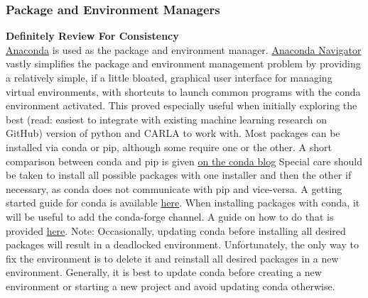 \documentclass{article}
\begin{document}
\subsubsection{Package and Environment Managers}
\label{subsec: Environment Managers}
\textbf{Definitely Review For Consistency}\\
\href{https://www.anaconda.com/}{Anaconda} is used as the package and environment manager. \href{https://www.anaconda.com/products/navigator}{Anaconda Navigator} vastly simplifies the package and environment management problem by providing a relatively simple, if a little bloated, graphical user interface for managing virtual environments, with shortcuts to launch common programs with the conda environment activated. This proved especially useful when initially exploring the best (read: easiest to integrate with existing machine learning research on GitHub) version of python and CARLA to work with. Most packages can be installed via conda or pip, although some require one or the other. A short comparison between conda and pip is given \href{https://www.anaconda.com/blog/understanding-conda-and-pip}{on the conda blog} Special care should be taken to install all possible packages with one installer and then the other if necessary, as conda does not communicate with pip and vice-versa. %
A getting started guide for conda is available \href{https://docs.conda.io/projects/conda/en/latest/user-guide/getting-started.html}{here}.
When installing packages with conda, it will be useful to add the conda-forge channel. A guide on how to do that is provided \href{https://docs.conda.io/projects/conda/en/latest/user-guide/concepts/channels.html}{here}.
Note: Occasionally, updating conda before installing all desired packages will result in a deadlocked environment. Unfortunately, the only way to fix the environment is to delete it and reinstall all desired packages in a new environment. Generally, it is best to update conda before creating a new environment or starting a new project and avoid updating conda otherwise.
\\
\end{document}
